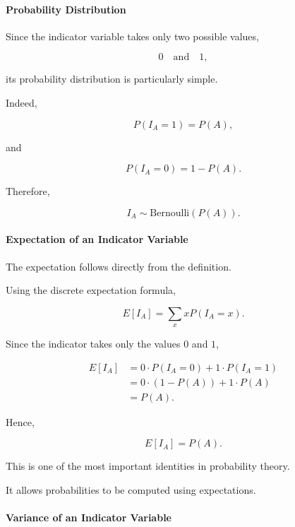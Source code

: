 \documentclass[11pt]{article}
\begin{document}
\begin{mdframed}[
		linewidth=0.8pt,
		roundcorner=6pt,
		backgroundcolor=gray!5,
		linecolor=gray!60,
		innertopmargin=10pt,
		innerbottommargin=10pt,
		innerleftmargin=10pt,
		innerrightmargin=10pt
		]
		\bigskip
		
		\paragraph{Probability Distribution}
		
		Since the indicator variable takes only two possible values,
		
		\[
		0
		\quad\text{and}\quad
		1,
		\]
		
		its probability distribution is particularly simple.
		
		Indeed,
		
		\[
		P(I_A=1)=P(A),
		\]
		
		and
		
		\[
		P(I_A=0)=1-P(A).
		\]
		
		Therefore,
		
		\[
		I_A
		\sim
		\text{Bernoulli}(P(A)).
		\]
		
		\bigskip
		
		\paragraph{Expectation of an Indicator Variable}
		
		The expectation follows directly from the definition.
		
		Using the discrete expectation formula,
		
		\[
		E[I_A]
		=
		\sum_x
		xP(I_A=x).
		\]
		
		Since the indicator takes only the values \(0\) and \(1\),
		
		\[
		\begin{aligned}
			E[I_A]
			&=
			0\cdot P(I_A=0)
			+
			1\cdot P(I_A=1)
			\\[0.3cm]
			&=
			0\cdot(1-P(A))
			+
			1\cdot P(A)
			\\[0.3cm]
			&=
			P(A).
		\end{aligned}
		\]
		
		Hence,
		
		\[
		\boxed{
			E[I_A]=P(A).
		}
		\]
		
		This is one of the most important identities in probability theory.
		
		It allows probabilities to be computed using expectations.
		
		\bigskip
		
		\paragraph{Variance of an Indicator Variable}
		

\end{mdframed}
\end{document}
